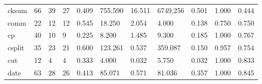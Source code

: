 \begin{longtable}{lp{1.8cm}p{1.8cm}p{1.8cm}p{1.8cm}p{1.8cm}p{1.8cm}p{1.8cm}p{1.8cm}p{1.8cm}p{1.8cm}}
cksum     &                           66 &                 39 &                                27 &                                      0.409 &                                755.590 &                                       16.511 &                          6749.256 &                                   0.501 &                              1.000 &                                              0.444 \\
comm      &                           22 &                 12 &                                12 &                                      0.545 &                                 18.250 &                                        2.054 &                             4.000 &                                   0.138 &                              0.750 &                                              0.750 \\
cp        &                           40 &                 10 &                                 9 &                                      0.225 &                                  8.200 &                                        1.485 &                             9.300 &                                   0.185 &                              1.000 &                                              0.767 \\
csplit    &                           35 &                 23 &                                21 &                                      0.600 &                                123.261 &                                        0.537 &                           359.087 &                                   0.150 &                              0.957 &                                              0.754 \\
cut       &                           12 &                  4 &                                 4 &                                      0.333 &                                  4.000 &                                        0.032 &                             5.750 &                                   0.032 &                              1.000 &                                              0.833 \\
date      &                           63 &                 28 &                                26 &                                      0.413 &                                 85.071 &                                        0.571 &                            81.036 &                                   0.357 &                              1.000 &                                              0.845 \\

\end{longtable}
